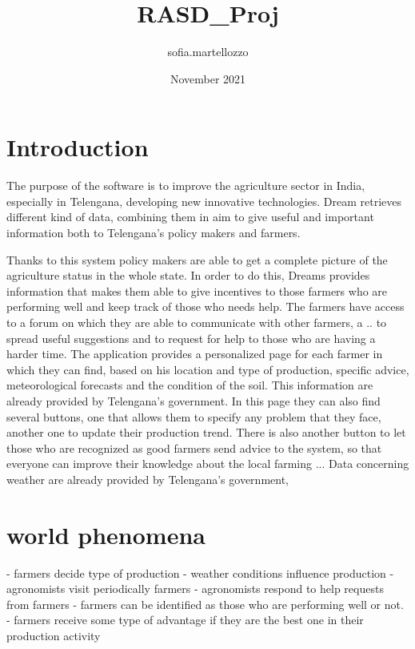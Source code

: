 \documentclass{article}
\title{RASD_Proj}
\author{sofia.martellozzo }
\date{November 2021}
\begin{document}
\maketitle

\newpage

\tableofcontents


\newpage


\section{Introduction}

The purpose of the software is to improve the agriculture sector in India, especially in Telengana, developing new innovative technologies.
Dream retrieves different kind of data, combining them in aim to give useful and important information both to Telengana's policy makers and farmers.

    Thanks to this system policy makers are able to get a complete picture of the agriculture status in the whole state.
    In order to do this,  Dreams provides information that makes them able to give incentives to those farmers who are performing well and keep track of those who needs help.
    The farmers have access to a forum on which they are able to communicate with other farmers, a .. to spread useful suggestions and to request for help to those who are having a harder time.
    The application provides a personalized page for each farmer in which they can find, based on his location and type of production, specific advice, meteorological forecasts and the condition of the soil.
    This information are already provided by Telengana's government.
    In this page they can also find several buttons, one that allows them to specify any problem that they face,
    another one to update their production trend. There is also another button to let those who are recognized as good farmers send advice to the system, so that everyone can improve their knowledge about the local farming ...
    Data concerning weather are already provided by Telengana's government, 
    

\section{world phenomena}
- farmers decide type of production
- weather conditions influence production
- agronomists visit periodically farmers
- agronomists respond to help requests from farmers
- farmers can be identified as those who are performing well or not.
- farmers receive some type of advantage if they are the best one in their production activity
\end{document}
